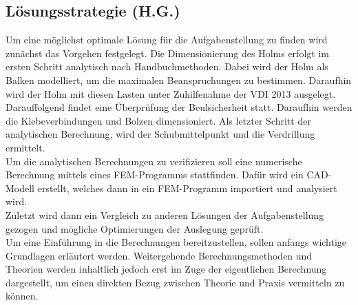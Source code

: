 \subsection{Lösungsstrategie (H.G.)}
Um eine möglichst optimale Lösung für die Aufgabenstellung zu finden wird zunächst das Vorgehen festgelegt. Die Dimensionierung des Holms erfolgt im ersten Schritt analytisch nach Handbuchmethoden. Dabei wird der Holm als Balken modelliert, um die maximalen Beanspruchungen zu bestimmen. Daraufhin wird der Holm mit diesen Lasten unter Zuhilfenahme der VDI 2013 ausgelegt. Darauffolgend findet eine Überprüfung der Beulsicherheit statt. Daraufhin werden die Klebeverbindungen und Bolzen dimensioniert. Als letzter Schritt der analytischen Berechnung, wird der Schubmittelpunkt und die Verdrillung ermittelt.\\
Um die analytischen Berechnungen zu verifizieren soll eine numerische Berechnung mittels eines FEM-Programms stattfinden. Dafür wird ein CAD-Modell erstellt, welches dann in ein FEM-Programm importiert und analysiert wird.\\
Zuletzt wird dann ein Vergleich zu anderen Lösungen der Aufgabenstellung gezogen und mögliche Optimierungen der Auslegung geprüft.\\

\noindent Um eine Einführung in die Berechnungen bereitzustellen, sollen anfangs wichtige Grundlagen erläutert werden. Weitergehende Berechnungsmethoden und Theorien werden inhaltlich jedoch erst im Zuge der eigentlichen Berechnung dargestellt, um einen direkten Bezug zwischen Theorie und Praxis vermitteln zu können. 
